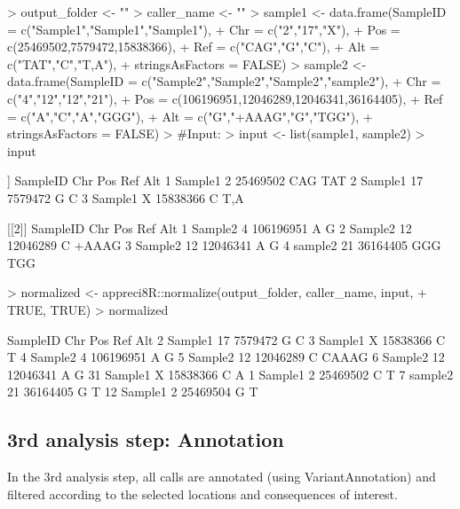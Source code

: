 \documentclass{article}
\begin{document}
\begin{Schunk}
\begin{Sinput}
> output_folder <- ""
> caller_name <- ""
> sample1 <- data.frame(SampleID = c("Sample1","Sample1","Sample1"),
+                       Chr = c("2","17","X"),
+                       Pos = c(25469502,7579472,15838366),
+                       Ref = c("CAG","G","C"),
+                       Alt = c("TAT","C","T,A"),
+                       stringsAsFactors = FALSE)
> sample2 <- data.frame(SampleID = c("Sample2","Sample2","Sample2","sample2"),
+                       Chr = c("4","12","12","21"),
+                       Pos = c(106196951,12046289,12046341,36164405),
+                       Ref = c("A","C","A","GGG"),
+                       Alt = c("G","+AAAG","G","TGG"),
+                       stringsAsFactors = FALSE)
> #Input:
> input <- list(sample1, sample2)
> input
\end{Sinput}
\begin{Soutput}
[[1]]
  SampleID Chr      Pos Ref Alt
1  Sample1   2 25469502 CAG TAT
2  Sample1  17  7579472   G   C
3  Sample1   X 15838366   C T,A

[[2]]
  SampleID Chr       Pos Ref   Alt
1  Sample2   4 106196951   A     G
2  Sample2  12  12046289   C +AAAG
3  Sample2  12  12046341   A     G
4  sample2  21  36164405 GGG   TGG
\end{Soutput}
\begin{Sinput}
> normalized <- appreci8R::normalize(output_folder, caller_name, input,
+                                    TRUE, TRUE)
> normalized
\end{Sinput}
\begin{Soutput}
   SampleID Chr       Pos Ref   Alt
2   Sample1  17   7579472   G     C
3   Sample1   X  15838366   C     T
4   Sample2   4 106196951   A     G
5   Sample2  12  12046289   C CAAAG
6   Sample2  12  12046341   A     G
31  Sample1   X  15838366   C     A
1   Sample1   2  25469502   C     T
7   sample2  21  36164405   G     T
12  Sample1   2  25469504   G     T
\end{Soutput}
\end{Schunk}

\subsection{3rd analysis step: Annotation}

In the 3rd analysis step, all calls are annotated (using VariantAnnotation) and filtered according to the selected locations and consequences of interest.
\end{document}
